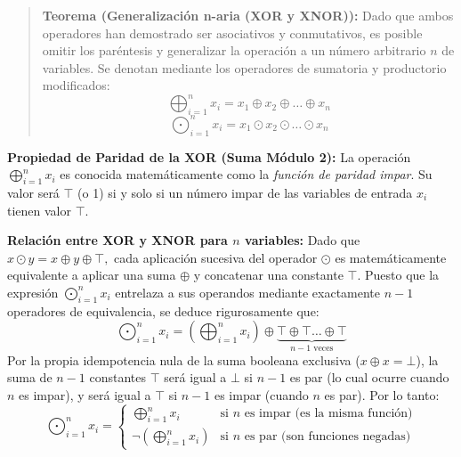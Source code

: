 \begin{quote}\textbf{Teorema (Generalización n-aria (XOR y XNOR)):}\label{gen_xor}
Dado que ambos operadores han demostrado ser asociativos y conmutativos, es posible omitir los paréntesis y generalizar la operación a un número arbitrario $n$ de variables. Se denotan mediante los operadores de sumatoria y productorio modificados:
\[ \bigoplus_{i=1}^{n} x_i = x_1 \oplus x_2 \oplus \dots \oplus x_n \]
\[ \bigodot_{i=1}^{n} x_i = x_1 \odot x_2 \odot \dots \odot x_n \]
\end{quote}

\textbf{Propiedad de Paridad de la XOR (Suma Módulo 2):}
La operación $\bigoplus_{i=1}^{n} x_i$ es conocida matemáticamente como la \textit{función de paridad impar}. Su valor será $\top$ (o 1) si y solo si un número impar de las variables de entrada $x_i$ tienen valor $\top.$

\textbf{Relación entre XOR y XNOR para $n$ variables:}
Dado que $x \odot y = x \oplus y \oplus \top,$ cada aplicación sucesiva del operador $\odot$ es matemáticamente equivalente a aplicar una suma $\oplus$ y concatenar una constante $\top.$ Puesto que la expresión $\bigodot_{i=1}^{n} x_i$ entrelaza a sus operandos mediante exactamente $n-1$ operadores de equivalencia, se deduce rigurosamente que:
\[ \bigodot_{i=1}^{n} x_i = \left( \bigoplus_{i=1}^{n} x_i \right) \oplus \underbrace{\top \oplus \top \dots \oplus \top}_{n-1 \text{ veces}} \]
Por la propia idempotencia nula de la suma booleana exclusiva ($x \oplus x = \bot$), la suma de $n-1$ constantes $\top$ será igual a $\bot$ si $n-1$ es par (lo cual ocurre cuando $n$ es impar), y será igual a $\top$ si $n-1$ es impar (cuando $n$ es par). Por lo tanto:
\[ 
\bigodot_{i=1}^{n} x_i = \begin{cases} 
\bigoplus_{i=1}^{n} x_i & \text{si } n \text{ es impar (es la misma función)} \\
\neg \left( \bigoplus_{i=1}^{n} x_i \right) & \text{si } n \text{ es par (son funciones negadas)}
\end{cases} 
\]

